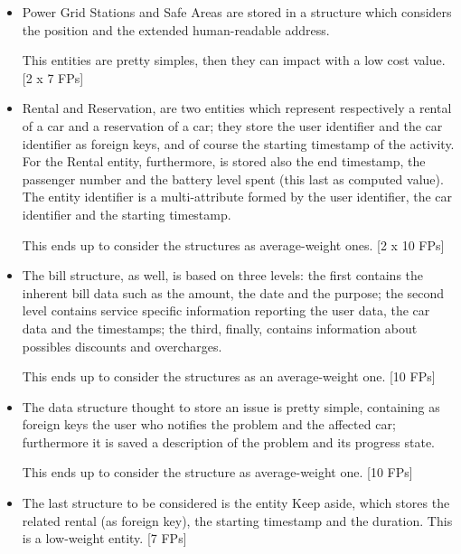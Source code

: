 \documentclass{scrreprt}
\begin{document}
\begin{itemize}
\item Power Grid Stations and Safe Areas are stored in a structure which considers the position and the extended human-readable address.

This entities are pretty simples, then they can impact with a low cost value. [2 x 7 FPs]

\item Rental and Reservation, are two entities which represent respectively a rental of a car and a reservation of a car; they store the user identifier and the car identifier as foreign keys, and of course the starting timestamp of the activity. For the Rental entity, furthermore, is stored also the end timestamp, the passenger number and the battery level spent (this last as computed value). The entity identifier is a multi-attribute formed by the user identifier, the car identifier and the starting timestamp.

This ends up to consider the structures as average-weight ones. [2 x 10 FPs]

\item The bill structure, as well, is based on three levels: the first contains the inherent bill data such as the amount, the date and the purpose; the second level contains service specific information reporting the user data, the car data and the timestamps; the third, finally, contains information about possibles discounts and overcharges.

This ends up to consider the structures as an average-weight one. [10 FPs]

\item The data structure thought to store an issue is pretty simple, containing as foreign keys the user who notifies the problem and the affected car; furthermore it is saved a description of the problem and its progress state.

This ends up to consider the structure as average-weight one. [10 FPs]

\item The last structure to be considered is the entity Keep aside, which stores the related rental (as foreign key), the starting timestamp and the duration.
This is a low-weight entity. [7 FPs]
\end{itemize}
\end{document}
